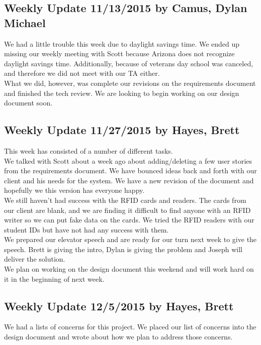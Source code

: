 \documentclass[10pt, onecolumn, twoside, peerreview]{IEEEtran}
\begin{document}
\subsection{Weekly Update 11/13/2015 by Camus, Dylan Michael}
We had a little trouble this week due to daylight savings time. We ended up missing our weekly meeting with Scott because Arizona does not recognize daylight savings time. Additionally, because of veterans day school was canceled, and therefore we did not meet with our TA either.\\

What we did, however, was complete our revisions on the requirements document and finished the tech review. We are looking to begin working on​ our design document soon.

\subsection{Weekly Update 11/27/2015 by Hayes, Brett}
This week has consisted of a number of different tasks.\\

We talked with Scott about a week ago about adding/deleting a few user stories from the requirements document. We have bounced ideas back and forth with our client and his needs for the system. We have a new revision of the document and hopefully we this version has everyone happy.\\

We still haven't had success with the RFID cards and readers. The cards from our client are blank, and we are finding it difficult to find anyone with an RFID writer so we can put fake data on the cards. We tried the RFID readers with our student IDs but have not had any success with them.\\

We prepared our elevator speech and are ready for our turn next week to give the speech. Brett is giving the intro, Dylan is giving the problem and Joseph will deliver the solution.\\

We plan on working on the design document this weekend and will work hard on it in the beginning of next week.

\subsection{Weekly Update 12/5/2015 by Hayes, Brett}
We had a lists of concerns for this project. We placed our list of concerns into the design document and wrote about how we plan to address those concerns.\\
\end{document}
